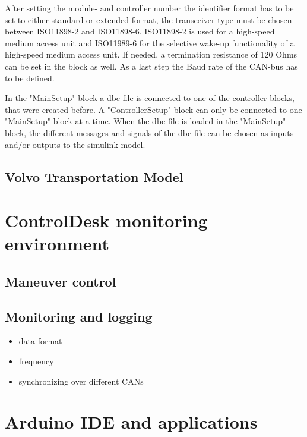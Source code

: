 \documentclass[ExampleMasters.tex]{subfiles}
\begin{document}
After setting the module- and controller number the identifier format has to be set to either standard or extended format, the transceiver type must be chosen between ISO11898-2 and ISO11898-6. ISO11898-2 is used for a high-speed medium access unit and ISO11989-6 for the selective wake-up functionality of a high-speed medium access unit. If needed, a termination resistance of 120 Ohms can be set in the block as well. As a last step the Baud rate of the CAN-bus has to be defined.


In the "MainSetup" block a dbc-file is connected to one of the controller blocks, that were created before. A "ControllerSetup" block can only be connected to one "MainSetup" block at a time. When the dbc-file is loaded in the "MainSetup" block, the different messages and signals of the dbc-file can be chosen as inputs and/or outputs to the simulink-model.
\subsection{Volvo Transportation Model}



\section{ControlDesk monitoring environment}
\label{sec:control_desk}
\subsection{Maneuver control}


\subsection{Monitoring and logging}
\begin{itemize}
	\item data-format
	\item frequency
	\item synchronizing over different CANs	
\end{itemize}


\section{Arduino IDE and applications}
\label{sec:arduino_applications}
\end{document}
